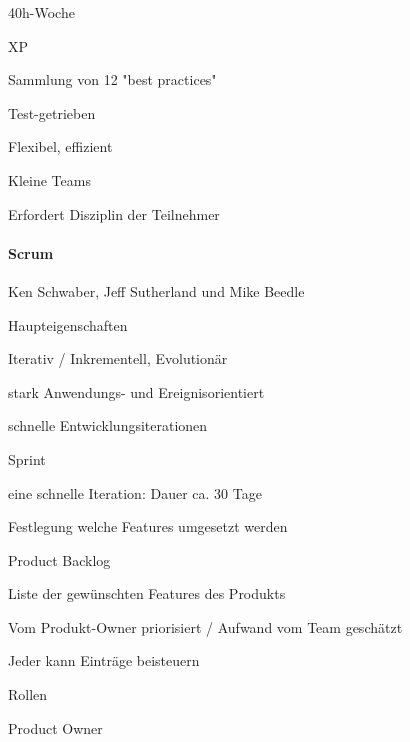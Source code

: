 \documentclass[a4paper]{article}
\begin{document}
\begin{multicols}{3}
\begin{itemize*}
    \item 40h-Woche
    \item XP
    \begin{itemize*}
      \item Sammlung von 12 "best practices"
      \item Test-getrieben
      \item Flexibel, effizient
      \item Kleine Teams
      \item Erfordert Disziplin der Teilnehmer
    \end{itemize*}
  \end{itemize*}

  \paragraph{Scrum}
  \begin{itemize*}
    \item [Ken Schwaber, Jeff Sutherland und Mike Beedle]
    \item Haupteigenschaften
    \begin{itemize*}
      \item Iterativ / Inkrementell, Evolutionär
      \item stark Anwendungs- und Ereignisorientiert
      \item schnelle Entwicklungsiterationen
    \end{itemize*}
    \item Sprint
    \begin{itemize*}
      \item eine schnelle Iteration: Dauer ca. 30 Tage
      \item Festlegung welche Features umgesetzt werden
    \end{itemize*}
    \item Product Backlog
    \begin{itemize*}
      \item Liste der gewünschten Features des Produkts
      \item Vom Produkt-Owner priorisiert / Aufwand vom Team geschätzt
      \item Jeder kann Einträge beisteuern
    \end{itemize*}
    \item Rollen
    \begin{itemize*}
      \item Product Owner

\end{itemize*}
\end{itemize*}
\end{multicols}
\end{document}

